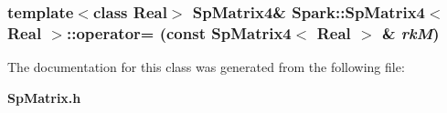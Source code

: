 \subsubsection{\setlength{\rightskip}{0pt plus 5cm}template$<$class Real$>$ {\bf Sp\-Matrix4}\& {\bf Spark::Sp\-Matrix4}$<$ Real $>$::operator= (const {\bf Sp\-Matrix4}$<$ Real $>$ \& {\em rk\-M})}\label{classSpark_1_1SpMatrix4_a5}




The documentation for this class was generated from the following file:\begin{CompactItemize}
\item 
{\bf Sp\-Matrix.h}\end{CompactItemize}
